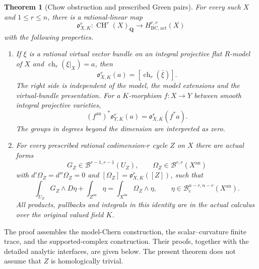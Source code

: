 \documentclass[11pt,a4paper]{article}
\newtheorem{theorem}{Theorem}[section]
\theoremstyle{definition}
\theoremstyle{remark}
\begin{document}
\begin{theorem}[Chow obstruction and prescribed Green pairs]
\label{h22:main}
For every such $X$ and $1\le r\le n$, there is a rational-linear map
\[
 \mathfrak o^r_{X,K}:\operatorname{CH}^r(X)_{\mathbf Q}
                 \longrightarrow H^{r,r}_{\mathrm{BC,act}}(X)
\]
with the following properties.
\begin{enumerate}
\item If $\xi$ is a rational virtual vector bundle on an integral
projective flat $R$-model of $X$ and
$\operatorname{ch}_r(\xi|_X)=a$, then
\[
              \mathfrak o^r_{X,K}(a)
                         =[\operatorname{ch}_r(\bar\xi)].
\]
The right side is independent of the model, the model extensions and
the virtual-bundle presentation. For a $K$-morphism $f:X\to Y$
between smooth integral projective varieties,
\[
 (f^{\mathrm{an}})^*\mathfrak o^r_{Y,K}(a)
                    =\mathfrak o^r_{X,K}(f^*a).
\]
The groups in degrees beyond the dimension are interpreted as zero.
\item For every prescribed rational codimension-$r$ cycle $Z$ on $X$
there are actual forms
\[
 G_Z\in\mathcal B^{r-1,r-1}(U_Z),\qquad
 \Omega_Z\in\mathcal B^{r,r}(X^{\mathrm{an}})
\]
with $d'\Omega_Z=d''\Omega_Z=0$ and
$[\Omega_Z]=\mathfrak o^r_{X,K}([Z])$, such that
\begin{equation}
\label{h22:curved-identity}
 \int_{U_Z}G_Z\wedge D\eta+\int_{Z^{\mathrm{an}}}\eta
       =\int_{X^{\mathrm{an}}}\Omega_Z\wedge\eta,
 \qquad \eta\in\mathcal B_c^{n-r,n-r}(X^{\mathrm{an}}).
\end{equation}
All products, pullbacks and integrals in this identity are in the
actual calculus over the original valued field $K$.
\end{enumerate}
\end{theorem}

The proof assembles the model-Chern construction, the scalar--curvature
finite trace, and the supported-complex construction. Their proofs,
together with the detailed analytic interfaces, are given below. The present theorem does not assume that
$Z$ is homologically trivial.
\end{document}
